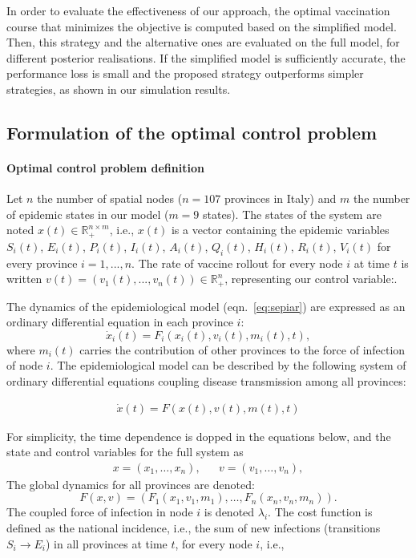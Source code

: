 In order to evaluate the effectiveness of our approach, the optimal vaccination course that minimizes the objective is computed based on the simplified model. Then, this strategy and the alternative ones are evaluated on the full model, for different posterior realisations. If the simplified model is sufficiently accurate, the performance loss is small and the proposed strategy outperforms simpler strategies, as shown in our simulation results.

\subsection{Formulation of the optimal control problem}
\paragraph{Optimal control problem definition}Let $n$ the number of spatial nodes ($n=107$ provinces in Italy) and $m$ the number of epidemic states in our model ($m=9$ states).
The states of the system are noted $x(t) \in \mathbb{R}_+^{n\times m}$, i.e., $x(t)$ is a vector containing the epidemic variables $S_i(t)$, $E_i(t)$, $P_i(t)$, $I_i(t)$, $A_i(t)$, $Q_i(t)$, $H_i(t)$, $R_i(t)$, $V_i(t)$ for every province $i=1,...,n$. The rate of vaccine rollout for every node $i$ at time $t$ is written $v(t) = (v_1(t),...,v_n(t)) \in \mathbb{R}_+^{n}$, representing our control variable:. %

The dynamics of the epidemiological model (eqn.~\eqref{eq:sepiar}) are expressed as an ordinary differential equation in each province $i$:
\begin{equation}
    \label{eq:sepiar_compact}
    \dot x_i(t) = F_i(x_i(t),v_i(t), m_i(t), t),
\end{equation}
where $m_i(t)$ carries the contribution of other provinces to the force of infection of node $i$. The epidemiological model can be described by the following system of ordinary differential equations coupling disease transmission among all provinces:

\begin{align}
    \dot x(t) = F(x(t),v(t),m(t),t)
    \label{eq:dynamics}
\end{align}

For simplicity, the time dependence is dopped in the equations below, and the state and control variables for the full system as
\begin{align*}
    x = (x_1,\ldots,x_n), && v = (v_1,\ldots,v_n),
\end{align*}
The global dynamics for all provinces are denoted:
\begin{equation*}
    F(x,v) = (F_1(x_1,v_1, m_1),\ldots,F_n(x_n,v_n, m_n)).
\end{equation*}
The coupled force of infection in node $i$ is denoted $\lambda_i$. The cost function is defined as the national incidence, i.e., the sum of new infections (transitions $S_i\longrightarrow E_i$) in all provinces at time $t$,  for every node $i$, i.e.,

